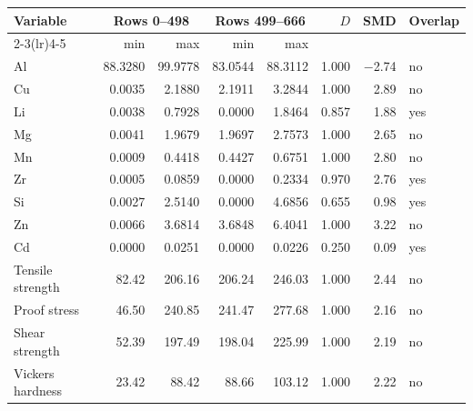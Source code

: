 \begin{tabular}{@{}lrrrrrrl@{}}
\toprule
Variable & \multicolumn{2}{c}{Rows 0--498} & \multicolumn{2}{c}{Rows 499--666} & $D$ & SMD & Overlap \\
\cmidrule(lr){2-3}\cmidrule(lr){4-5}
 & min & max & min & max & & & \\
\midrule
Al & 88.3280 & 99.9778 & 83.0544 & 88.3112 & 1.000 & $-$2.74 & no \\
Cu & 0.0035 & 2.1880 & 2.1911 & 3.2844 & 1.000 & 2.89 & no \\
Li & 0.0038 & 0.7928 & 0.0000 & 1.8464 & 0.857 & 1.88 & yes \\
Mg & 0.0041 & 1.9679 & 1.9697 & 2.7573 & 1.000 & 2.65 & no \\
Mn & 0.0009 & 0.4418 & 0.4427 & 0.6751 & 1.000 & 2.80 & no \\
Zr & 0.0005 & 0.0859 & 0.0000 & 0.2334 & 0.970 & 2.76 & yes \\
Si & 0.0027 & 2.5140 & 0.0000 & 4.6856 & 0.655 & 0.98 & yes \\
Zn & 0.0066 & 3.6814 & 3.6848 & 6.4041 & 1.000 & 3.22 & no \\
Cd & 0.0000 & 0.0251 & 0.0000 & 0.0226 & 0.250 & 0.09 & yes \\
Tensile strength & 82.42 & 206.16 & 206.24 & 246.03 & 1.000 & 2.44 & no \\
Proof stress & 46.50 & 240.85 & 241.47 & 277.68 & 1.000 & 2.16 & no \\
Shear strength & 52.39 & 197.49 & 198.04 & 225.99 & 1.000 & 2.19 & no \\
Vickers hardness & 23.42 & 88.42 & 88.66 & 103.12 & 1.000 & 2.22 & no \\
\bottomrule
\end{tabular}
